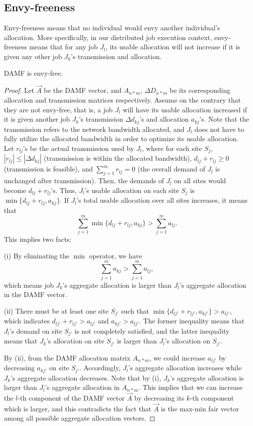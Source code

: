 \subsection{Envy-freeness}
Envy-freeness means that no individual would envy another individual's allocation. More specifically, in our distributed job execution context, envy-freeness means that for any job $J_l$, its usable allocation will not increase if it is given any other job $J_k$'s transmission and allocation.

\begin{theorem}
    DAMF is envy-free.
\end{theorem}

\begin{proof}
Let $\vec A$ be the DAMF vector, and $A_{n*m}$, $\Delta D_{n*m}$ be its corresponding allocation and transmission matrices respectively.
Assume on the contrary that they are not envy-free, that is, a job $J_l$ will have its usable allocation increased if it is given another job $J_k$'s transmission $\Delta d_{kj}$'s and allocation $a_{kj}$'s. Note that the transmission refers to the network bandwidth allocated, and $J_l$ does not have to fully utilize the allocated bandwidth in order to optimize its usable allocation. Let $r_{lj}$'s be the actual transmission used by $J_l$, where for each site $S_j$, $|r_{lj}| \leq |\Delta d_{kj}|$ (transmission is within the allocated bandwidth), $d_{lj} + r_{lj} \geq 0$ (transmission is feasible), and $\sum_{j=1}^m r_{lj} = 0$ (the overall demand of $J_l$ is unchanged after transmission). Then, the demands of $J_l$ on all sites would become $d_{lj} + r_{lj}$'s. Thus, $J_l$'s usable allocation on each site $S_j$ is $\min\{d_{lj}+r_{lj}, a_{kj}\}$. If $J_l$'s total usable allocation over all sites increases, it means that
$$
\sum_{j=1}^m \min\{d_{lj}+r_{lj}, a_{kj}\} > \sum_{j=1}^m a_{lj}.
$$
This implies two facts:

(i) By eliminating the $\min$ operator, we have
$$
\sum_{j=1}^m a_{kj} > \sum_{j=1}^m a_{lj},
$$
which means job $J_k$'s aggregate allocation is larger than $J_l$'s aggregate allocation in the DAMF vector.

(ii) There must be at least one site $S_{j'}$ such that $\min\{d_{lj'}+r_{lj'}, a_{kj'}\} > a_{lj'}$, which indicates $d_{lj'}+r_{lj'} > a_{lj'}$ and $a_{kj'} > a_{lj'}$. The former inequality means that $J_l$'s demand on site $S_{j'}$ is not completely satisfied, and the latter inequality means that $J_k$'s allocation on site $S_{j'}$ is larger than $J_l$'s allocation on $S_{j'}$. 

By (ii), from the DAMF allocation matrix $A_{n*m}$, we could increase $a_{lj'}$ by decreasing $a_{kj'}$ on site $S_{j'}$. Accordingly, $J_l$'s aggregate allocation increases while $J_k$'s aggregate allocation decreases. Note that by (i), $J_k$'s aggregate allocation is larger than $J_l$'s aggregate allocation in $A_{n*m}$. This implies that we can increase the $l$-th component of the DAMF vector $\vec A$ by decreasing its $k$-th component which is larger, and this contradicts the fact that $\vec A$ is the max-min fair vector among all possible aggregate allocation vectors.
\end{proof}

